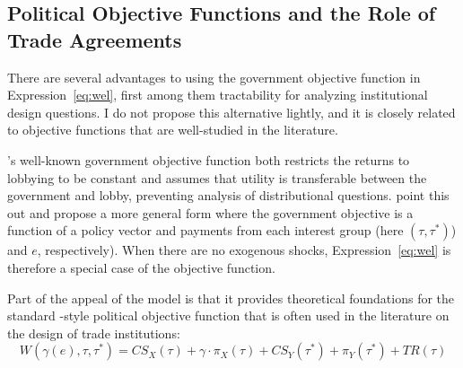 \documentclass[12pt,titlepage]{article}
\newtheorem{assumption}{Assumption}
\newcommand{\ve}{\theta}
\newcommand{\ga}{\gamma}
\begin{document}





\subsection{Political Objective Functions and the Role of Trade Agreements}
\label{sec:objfcn}
There are several advantages to using the government objective function in Expression~\ref{eq:wel}, first among them tractability for analyzing institutional design questions. I do not propose this alternative lightly, and it is closely related to objective functions that are well-studied in the literature.

\Textcite{gh94}'s well-known government objective function both restricts the returns to lobbying to be constant and assumes that utility is transferable between the government and lobby, preventing analysis of distributional questions. \Textcite{dgh97} point this out and propose a more general form where the government objective is a function of a policy vector and payments from each interest group (here $\left(\tau,\tau^*\right)$) and $e$, respectively). When there are no exogenous shocks, Expression~\ref{eq:wel} is therefore a special case of the \Textcite{dgh97} objective function.

Part of the appeal of the \Textcite{gh94} model is that it provides theoretical foundations for the standard \Textcite{baldwin}-style political objective function that is often used in the literature on the design of trade institutions:
\begin{equation}
  W(\ga(e),\tau,\tau^*) = \mathit{CS}_X(\tau) + \ga \cdot \pi_X(\tau) + \mathit{CS}_Y(\tau^*) + \pi_Y(\tau^*) + \mathit{TR}(\tau)
  \label{eq:baldwin}
\end{equation}
\end{document}
